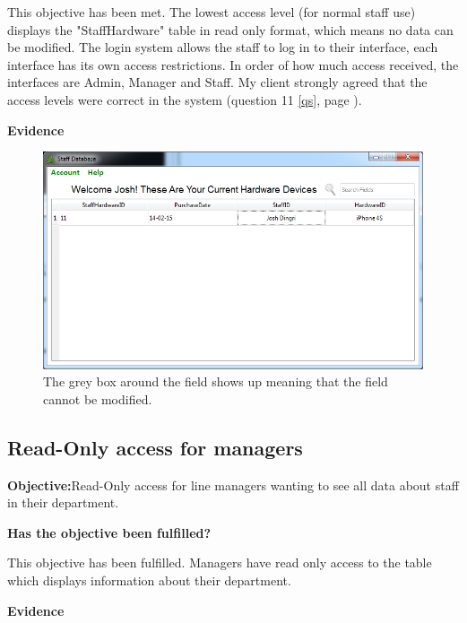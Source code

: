 This objective has been met. The lowest access level (for normal staff use) displays the "StaffHardware" table in read only format, which means no data can be modified. The login system allows the staff to log in to their interface, each interface has its own access restrictions. In order of how much access received, the interfaces are Admin, Manager and Staff. My client strongly agreed that the access levels were correct in the system (question 11 \ref{qs}, page \pageref{qs}).

\textbf{Evidence}

\begin{figure}[H]
    \includegraphics[width=\textwidth]{./Evaluation/Images/readonlystaff.png}
    \caption{The grey box around the field shows up meaning that the field cannot be modified.} 
\end{figure}



\subsection{Read-Only access for managers}

\textbf{Objective:}Read-Only access for line managers wanting to see all data about staff in their department.

\textbf{Has the objective been fulfilled?}

This objective has been fulfilled. Managers have read only access to the table which displays information about their department.

\textbf{Evidence}

